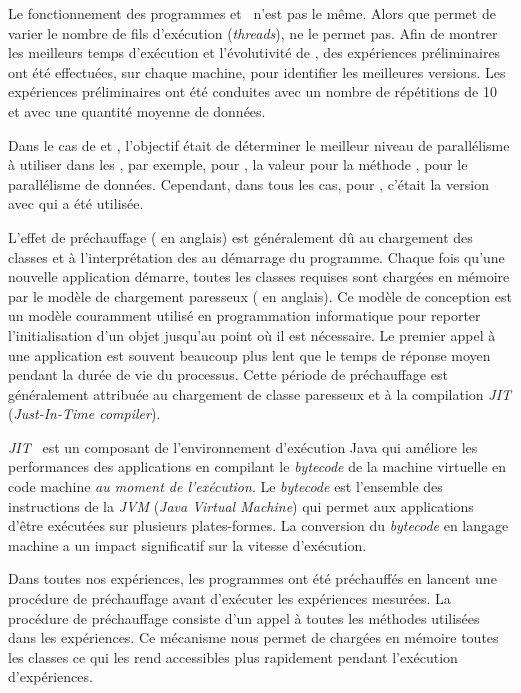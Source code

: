 Le fonctionnement des programmes  et~ n'est pas le m\^eme. Alors que  permet de varier le nombre de fils d'ex\'ecution (\emph{threads}),  ne le permet pas. Afin de montrer les meilleurs temps d'ex\'ecution et l'\'evolutivit\'e de , des exp\'eriences pr\'eliminaires ont \'et\'e effectu\'ees, sur chaque machine, pour identifier les meilleures versions. Les exp\'eriences pr\'eliminaires ont \'et\'e conduites avec un nombre de r\'ep\'etitions de 10 et avec une quantit\'e moyenne de donn\'ees. 

Dans le cas de  et , l'objectif \'etait de d\'eterminer le meilleur niveau de parall\'elisme \`a utiliser dans les , par exemple, pour , la valeur pour la m\'ethode , pour le parall\'elisme de donn\'ees. Cependant, dans tous les cas, pour , c'\'etait la version avec  qui a \'et\'e utilis\'ee.

L'effet de pr\'echauffage ( en anglais) est g\'en\'eralement d\^u au chargement des classes et \`a l'interpr\'etation des  au d\'emarrage du programme. Chaque fois qu'une nouvelle application d\'emarre, toutes les classes requises sont charg\'ees en m\'emoire par le mod\`ele de chargement paresseux ( en anglais). Ce mod\`ele de conception est un mod\`ele couramment utilis\'e en programmation informatique pour reporter l'initialisation d'un objet jusqu'au point o\`u il est n\'ecessaire. Le premier appel \`a une application  est souvent beaucoup plus lent que le temps de r\'eponse moyen pendant la dur\'ee de vie du processus. Cette p\'eriode de pr\'echauffage est g\'en\'eralement attribu\'ee au chargement de classe paresseux et à la compilation \emph{JIT} (\emph{Just-In-Time compiler}).    

\label{jitDescription.sect}
\emph{JIT}~\citep{cramer1997compiling} est un composant de l'environnement d'ex\'ecution Java qui am\'eliore les performances des applications en compilant le \emph{bytecode} de la machine virtuelle en code machine \emph{au moment de l'ex\'ecution}. Le \emph{bytecode} est l'ensemble des instructions de la \emph{JVM} (\emph{Java Virtual Machine}) qui permet aux applications d'\^etre ex\'ecut\'ees sur plusieurs plates-formes. La conversion du \emph{bytecode} en langage machine a un impact significatif sur la vitesse d'ex\'ecution.

Dans toutes nos exp\'eriences, les programmes  ont \'et\'e pr\'echauff\'es en lancent une proc\'edure de pr\'echauffage avant d'ex\'ecuter les exp\'eriences mesur\'ees. La proc\'edure de pr\'echauffage consiste d'un appel \`a toutes les m\'ethodes utilis\'ees dans les exp\'eriences. Ce m\'ecanisme nous permet de charg\'ees en m\'emoire toutes les classes ce qui les rend accessibles plus rapidement pendant l'ex\'ecution d'exp\'eriences.
 

